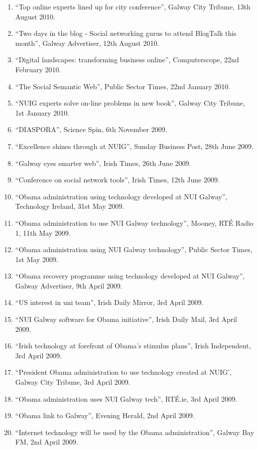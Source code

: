 \documentclass[10pt,a4paper]{res} %
\begin{document}
\begin{resume}
{\begin{enumerate}
\item ``Top online experts lined up for city conference'', Galway City Tribune, 13th August 2010.
\item ``Two days in the blog - Social networking gurus to attend BlogTalk this month'', Galway Advertiser, 12th August 2010.
\item ``Digital landscapes: transforming business online'', Computerscope, 22nd February 2010.
\item ``The Social Semantic Web'', Public Sector Times, 22nd January 2010.
\item ``NUIG experts solve on-line problems in new book'', Galway City Tribune, 1st January 2010.
\item ``DIASPORA'', Science Spin, 6th November 2009.
\item ``Excellence shines through at NUIG'', Sunday Business Post, 28th June 2009.
\item ``Galway eyes smarter web'', Irish Times, 26th June 2009.
\item ``Conference on social network tools'', Irish Times, 12th June 2009.
\item ``Obama administration using technology developed at NUI Galway'', Technology Ireland, 31st May 2009.
\item ``Obama administration to use NUI Galway technology'', Mooney, RT\'{E} Radio 1, 11th May 2009.
\item ``Obama administration using NUI Galway technology'', Public Sector Times, 1st May 2009.
\item ``Obama recovery programme using technology developed at NUI Galway'', Galway Advertiser, 9th April 2009.
\item ``US interest in uni team'', Irish Daily Mirror, 3rd April 2009.
\item ``NUI Galway software for Obama initiative'', Irish Daily Mail, 3rd April 2009.
\item ``Irish technology at forefront of Obama's stimulus plans'', Irish Independent, 3rd April 2009.
\item ``President Obama administration to use technology created at NUIG', Galway City Tribune, 3rd April 2009.
\item ``Obama administration uses NUI Galway tech'', RT\'{E}.ie, 3rd April 2009.
\item ``Obama link to Galway'', Evening Herald, 2nd April 2009.
\item ``Internet technology will be used by the Obama administration'', Galway Bay FM, 2nd April 2009.

\end{enumerate}}
\end{resume}
\end{document}
